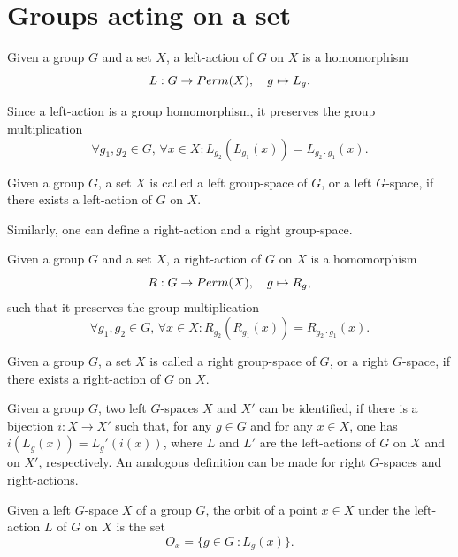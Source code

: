 \section{Groups acting on a set}
\begin{defn}
    Given a group $G$ and a set $X$, a left-action of $G$ on $X$ is a homomorphism
    \begin{equation}
        L : G \to {Perm}(X),\quad g \mapsto L_g.
    \end{equation}
\end{defn}
Since a left-action is a group homomorphism, it preserves the group multiplication 
\begin{equation}
    \forall g_1,g_2 \in G,\,\forall x \in X : L_{g_2}(L_{g_1}(x)) = L_{g_2 \cdot g_1}(x).
\end{equation}
\begin{defn}
    Given a group $G$, a set $X$ is called a left group-space of $G$, or a left $G$-space, if there exists a left-action of $G$ on $X$.
\end{defn}
Similarly, one can define a right-action and a right group-space.
\begin{defn}
    Given a group $G$ and a set $X$, a right-action of $G$ on $X$ is a homomorphism
    \begin{equation}
        R : G \to {Perm}(X),\quad g \mapsto R_g,
    \end{equation}
    such that it preserves the group multiplication
    \begin{equation}
        \forall g_1,g_2 \in G,\,\forall x \in X : R_{g_2}(R_{g_1}(x)) = R_{g_2 \cdot g_1}(x).
    \end{equation}
\end{defn}
\begin{defn}
    Given a group $G$, a set $X$ is called a right group-space of $G$, or a right $G$-space, if there exists a right-action of $G$ on $X$.
\end{defn}
Given a group $G$, two left $G$-spaces $X$ and $X'$ can be identified, if there is a bijection $i : X \to X'$ such that, for any $g \in G$ and for any $x \in X$, one has $i(L_g(x)) = L_g'(i(x))$, where $L$ and $L'$ are the left-actions of $G$ on $X$ and on $X'$, respectively. An analogous definition can be made for right $G$-spaces and right-actions. 
\begin{defn}[orbit]
    Given a left $G$-space $X$ of a group $G$, the orbit of a point $x \in X$ under the left-action $L$ of $G$ on $X$ is the set
    \begin{equation}
        O_x = \{g \in G\ : L_g(x) \}.
    \end{equation}
\end{defn}
